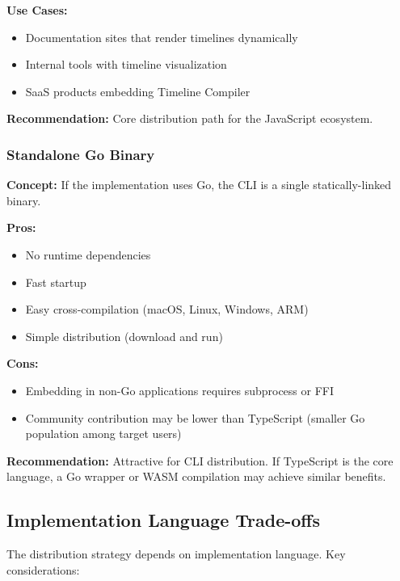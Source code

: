 \textbf{Use Cases:}
\begin{itemize}
  \item Documentation sites that render timelines dynamically
  \item Internal tools with timeline visualization
  \item SaaS products embedding Timeline Compiler
\end{itemize}

\textbf{Recommendation:} Core distribution path for the JavaScript ecosystem.

\subsubsection{Standalone Go Binary}

\textbf{Concept:} If the implementation uses Go, the CLI is a single statically-linked binary.

\textbf{Pros:}
\begin{itemize}
  \item No runtime dependencies
  \item Fast startup
  \item Easy cross-compilation (macOS, Linux, Windows, ARM)
  \item Simple distribution (download and run)
\end{itemize}

\textbf{Cons:}
\begin{itemize}
  \item Embedding in non-Go applications requires subprocess or FFI
  \item Community contribution may be lower than TypeScript (smaller Go population among target users)
\end{itemize}

\textbf{Recommendation:} Attractive for CLI distribution. If TypeScript is the core language, a Go wrapper or WASM compilation may achieve similar benefits.

\subsection{Implementation Language Trade-offs}

The distribution strategy depends on implementation language. Key considerations:

